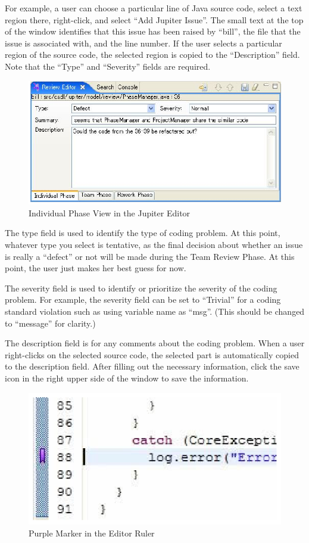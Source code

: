 For example, a user can choose a particular line of Java source code, select a text region there, right-click, and select ``Add Jupiter Issue''. The small text at the top of the window identifies that this issue has been raised by ``bill'', the file that the issue is associated with, and the line number. If the user selects a particular region of the source code, the selected region is copied to the ``Description'' field.  Note that the ``Type'' and ``Severity'' fields are required. 

\begin{figure}[htbp]
  \centering
  \includegraphics{images/fig3-26.eps}
  \caption{Individual Phase View in the Jupiter Editor}
  \label{fig3-26}
\end{figure}

The type field is used to identify the type of coding problem. At this point, whatever type you select is tentative, as the final decision about whether an issue is really a ``defect'' or not will be made during the Team Review Phase. At this point, the user just makes her best guess for now.

The severity field is used to identify or prioritize the severity of the coding problem. For example, the severity field can be set to ``Trivial'' for a coding standard violation such as using variable name as ``msg''. (This should be changed to ``message'' for clarity.)

The description field is for any comments about the coding problem. When a user right-clicks on the selected source code, the selected part is automatically copied to the description field. After filling out the necessary information, click the save icon in the right upper side of the window to save the information.

\begin{figure}[htbp]
  \centering
  \includegraphics{images/fig3-27.eps}
  \caption{Purple Marker in the Editor Ruler}
  \label{fig3-27}
\end{figure}

